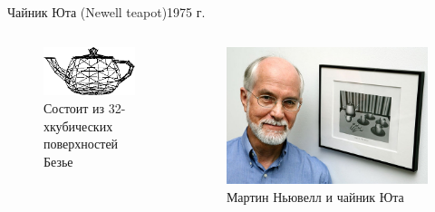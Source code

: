 \documentclass{beamer}
\begin{document}
\begin{frame}{Чайник Юта (Newell teapot)}{1975 г.}
	\begin{columns}
		\begin{column}{0.5\textwidth}
			\begin{figure} 
				\includegraphics[width=\textwidth]{images/Utah_teapot_model.png}
				\caption {Состоит из 32-хкубических поверхностей Безье}
			\end{figure}
		\end{column}
		\begin{column}{0.5\textwidth}
			\begin{figure} 
				\includegraphics[width=\textwidth]{images/Utah_teapot_and_Newell.png}
				\caption {Мартин Ньювелл и чайник Юта}
			\end{figure}
		\end{column}
	\end{columns}


\end{frame}
\end{document}
